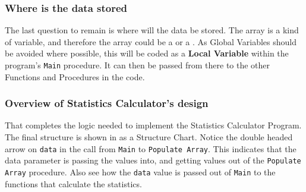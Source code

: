 \begin{figure}[htbp]
\end{figure}


\subsubsection{Where is the data stored} %
\label{ssub:where_is_the_data_stored}

The last question to remain is where will the data be stored. The array is a kind of variable, and therefore the array could be a  or a . As Global Variables should be avoided where possible, this will be coded as a \textbf{Local Variable} within the program's \texttt{Main} procedure. It can then be passed from there to the other Functions and Procedures in the code.


\clearpage
\subsubsection{Overview of Statistics Calculator's design} %
\label{ssub:overview_of_statistics_calculators_design}

That completes the logic needed to implement the Statistics Calculator Program. The final structure is shown in  as a Structure Chart. Notice the double headed arrow on \texttt{data} in the call from \texttt{Main} to \texttt{Populate Array}. This indicates that the data parameter is passing the values into, and getting values out of the \texttt{Populate Array} procedure. Also see how the \texttt{data} value is passed out of \texttt{Main} to the functions that calculate the statistics.

